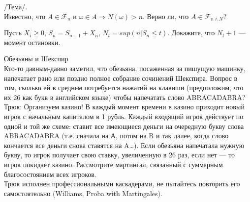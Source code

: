 \begin{problem}
 /Тема/. \\
Известно, что $A\in\mathcal{F}_{n}$ и $\omega\in A \Rightarrow
N(\omega)>n$. Верно ли, что $A \in \mathcal{F}_{n\wedge N}$?

\begin{sol}

\end{sol}
\end{problem}

\begin{problem}
Пусть $X_{i}\ge 0$, $S_{n}=S_{n-1}+X_{n}$, $N_{t}=sup(n|S_{n}\le
t)$. Докажите, что $N_{t}+1$ — момент остановки.

\begin{sol}

\end{sol}
\end{problem}

\begin{problem}
 Обезьяны и Шекспир \\
Кто-то давным-давно заметил, что обезьяна, посаженная за
пишущую машинку, напечатает рано или поздно полное собрание
сочинений Шекспира. Вопрос в том, сколько ей в
среднем потребуется нажатий на клавиши (предположим, что их 26 как
букв в
английском языке) чтобы напечатать слово ABRACADABRA? \\
Трюк: Организуем казино! В каждый момент времени в казино приходит
новый игрок с начальным капиталом в 1 рубль. Каждый входящий игрок
действует по одной и той же схеме: ставит все имеющиеся деньги на
очередную букву слова ABRACADABRA (т.е. сначала на А, потом на B и
так далее, когда слово кончается все деньги снова ставятся на A\ldots).
Если обезьяна напечатала нужную букву, то игрок получает свою
ставку, увеличенную в 26 раз, если нет — то игрок покидает казино.
Рассмотрите мартингал, связанный с суммарным благосостоянием всех
игроков. \\
Трюк исполнен профессиональными каскадерами, не пытайтесь
повторить его самостоятельно (Williams, Proba with Martingales).

\begin{sol}

\end{sol}
\end{problem}

